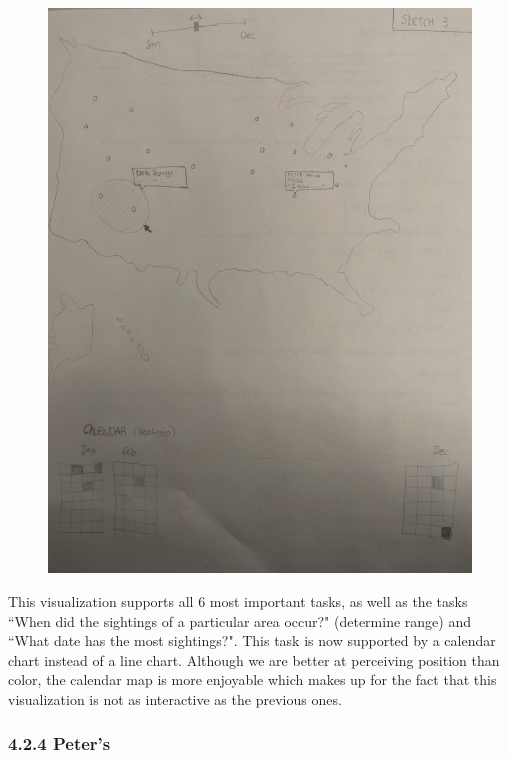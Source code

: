 \documentclass{neu_handout}
\begin{document}
\begin{figure}[h]
\centering
{
\includegraphics[width=0.7\linewidth]{lydia3}
}
\end{figure}

This visualization supports all 6 most important tasks, as well as the tasks ``When did the sightings of a particular area occur?" (determine range) and ``What date has the most sightings?". This task is now supported by a calendar chart instead of a line chart. Although we are better at perceiving position than color, the calendar map is more enjoyable which makes up for the fact that this visualization is not as interactive as the previous ones.

\newpage

\subsubsection*{4.2.4 Peter's}
\end{document}

